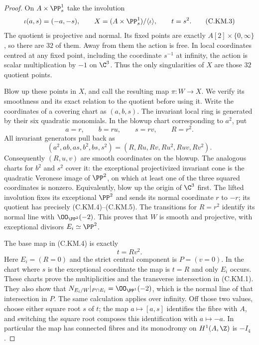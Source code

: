 \begin{proof}
On $A\times\PP^1_s$ take the involution
\[
       \iota(a,s)=(-a,-s),\qquad
 X=(A\times\PP^1_s)/\langle\iota\rangle,
       \qquad t=s^2.                                  \tag{C.KM.3}
\]
The quotient is projective and normal. Its fixed points are
exactly $A[2]\times\{0,\infty\}$, so there are $32$ of them.
Away from them the action is free. In local coordinates centred
at any fixed point, including the coordinate $s^{-1}$ at
infinity, the action is scalar multiplication by $-1$ on
$\C^3$. Thus the only singularities of $X$ are those $32$
quotient points.

Blow up these points in $X$, and call the resulting map
$\pi:W\to X$. We verify its smoothness and its exact relation
to the quotient before using it. Write the coordinates of a
covering chart as $(a,b,s)$. The invariant local ring is
generated by their six quadratic monomials. In the blowup
chart corresponding to $a^2$, put
\[
             a=r,\qquad b=ru,\qquad s=rv,
             \qquad R=r^2.                            \tag{C.KM.4}
\]
All invariant generators pull back as
\[
 (a^2,ab,as,b^2,bs,s^2)
           =(R,Ru,Rv,Ru^2,Ruv,Rv^2).                  \tag{C.KM.5}
\]
Consequently $(R,u,v)$ are smooth coordinates on the blowup.
The analogous charts for $b^2$ and $s^2$ cover it: the
exceptional projectivized invariant cone is the quadratic
Veronese image of $\PP^2$, on which at least one of the
three squared coordinates is nonzero. Equivalently, blow up
the origin of $\C^3$ first. The lifted involution fixes its
exceptional $\PP^2$ and sends its normal coordinate $r$ to
$-r$; its quotient has precisely (C.KM.4)--(C.KM.5).
The transitions for $R=r^2$ identify its normal line with
$\OO_{\PP^2}(-2)$. This proves that $W$ is smooth and
projective, with exceptional divisors $E_i\simeq\PP^2$.

The base map in (C.KM.4) is exactly
\[
                             t=R v^2.                 \tag{C.KM.6}
\]
Here $E_i=(R=0)$ and the strict central component is
$P=(v=0)$. In the chart where $s$ is the exceptional
coordinate the map is $t=R$ and only $E_i$ occurs.
These charts prove the multiplicities and the transverse
intersection in (C.KM.1). They also show that
$N_{E_i/W}|_{P\cap E_i}=\OO_{\PP^1}(-2)$, which is
the normal line of that intersection in $P$.
The same calculation applies over infinity. Off those two
values, choose either square root $s$ of $t$; the map
$a\mapsto[a,s]$ identifies the fibre with $A$, and switching
the square root composes this identification with $a\mapsto-a$.
In particular the map has connected fibres and its monodromy
on $H^1(A,\Z)$ is $-I_4$.


\end{proof}

